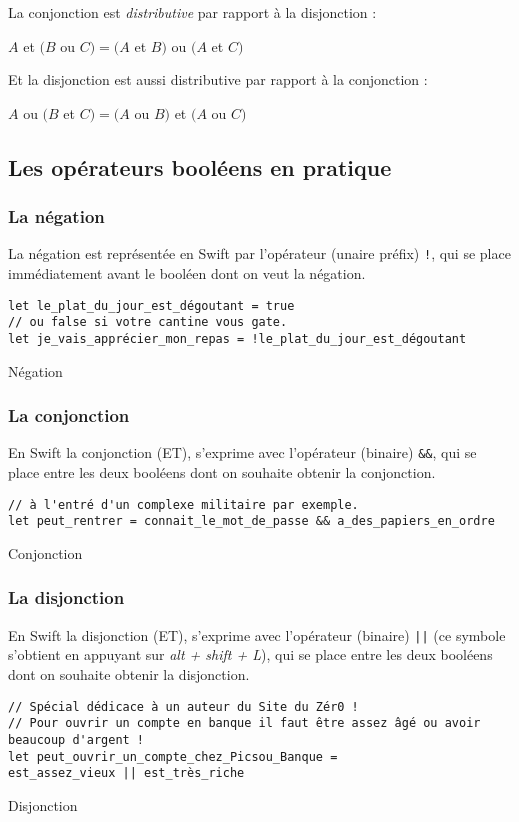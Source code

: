 La conjonction est \emph{distributive} par rapport à la disjonction :

$A$ et $(B$ ou $C) = (A$ et $B)$ ou $(A$ et $C)$

Et la disjonction est aussi distributive par rapport à la conjonction :

$A$ ou $(B$ et $C) = (A$ ou $B)$ et $(A$ ou $C)$

\subsection{Les opérateurs booléens en pratique}
\subsubsection{La négation}
La négation est représentée en Swift par l'opérateur (unaire préfix) \verb"!", qui se place immédiatement avant le booléen dont on veut la négation.
\begin{listing}[h]
\begin{verbatim}
let le_plat_du_jour_est_dégoutant = true
// ou false si votre cantine vous gate.
let je_vais_apprécier_mon_repas = !le_plat_du_jour_est_dégoutant
\end{verbatim}
\caption{Négation}
\end{listing}
\subsubsection{La conjonction}
En Swift la conjonction (ET), s'exprime avec l'opérateur (binaire) \verb"&&", qui se place entre les deux booléens dont on souhaite obtenir la conjonction.

\begin{listing}[h]
\begin{verbatim}
// à l'entré d'un complexe militaire par exemple.
let peut_rentrer = connait_le_mot_de_passe && a_des_papiers_en_ordre
\end{verbatim}
\caption{Conjonction}
\end{listing}
\subsubsection{La disjonction}
En Swift la disjonction (ET), s'exprime avec l'opérateur (binaire) \verb"||" (ce symbole s'obtient en appuyant sur \emph{alt + shift + L}), qui se place entre les deux booléens dont on souhaite obtenir la disjonction.

\begin{listing}[h]
\begin{verbatim}
// Spécial dédicace à un auteur du Site du Zér0 !
// Pour ouvrir un compte en banque il faut être assez âgé ou avoir beaucoup d'argent !
let peut_ouvrir_un_compte_chez_Picsou_Banque = 
est_assez_vieux || est_très_riche
\end{verbatim}
\caption{Disjonction}
\end{listing}

